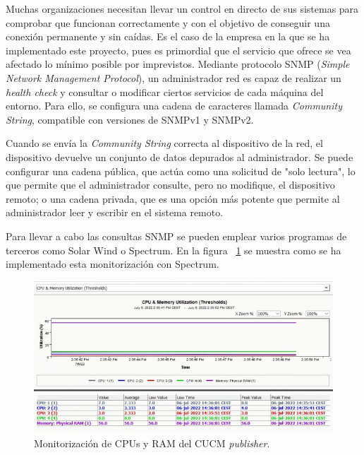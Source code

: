 \documentclass[a4paper, 12pt]{book}
\begin{document}
Muchas organizaciones necesitan llevar un control en directo de sus sistemas para comprobar que funcionan correctamente y con el objetivo de conseguir una conexión permanente y sin caídas. Es el caso de la empresa en la que se ha implementado este proyecto, pues es primordial que el servicio que ofrece se vea afectado lo mínimo posible por imprevistos. Mediante protocolo SNMP (\emph{Simple Network Management Protocol}), un administrador red es capaz de realizar un \emph{health check} y consultar o modificar ciertos servicios de cada máquina del entorno. Para ello, se configura una cadena de caracteres llamada \emph{Community String}, compatible con versiones de SNMPv1 y SNMPv2.

Cuando se envía la \emph{Community String} correcta al dispositivo de la red, el dispositivo devuelve un conjunto de datos depurados al administrador. Se puede configurar una cadena pública, que actúa como una solicitud de "solo lectura", lo que permite que el administrador consulte, pero no modifique, el dispositivo remoto; o una cadena privada, que es una opción más potente que permite al administrador leer y escribir en el sistema remoto.

Para llevar a cabo las consultas SNMP se pueden emplear varios programas de terceros como Solar Wind o Spectrum. En la figura ~\ref{figura:fig_spectrum} se muestra como se ha implementado esta monitorización con Spectrum.
\begin{figure}
  \centering
  \includegraphics[scale = 1.2]{img/fig_spectrum}
  \caption{Monitorización de CPUs y RAM del CUCM \emph{publisher}.}
  \label{figura:fig_spectrum}
\end{figure}



\end{document}
